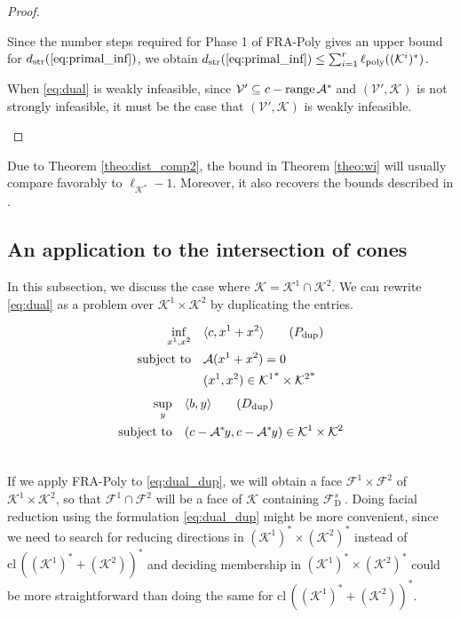 \documentclass{article}
\newcommand{\closure}{\mathrm{cl}\,}
\newcommand{\inProd}[2]{\langle #1 , #2 \rangle }
\newcommand{\feasS}{\mathcal{F}_{\text{D }}^s}
\newcommand{\stdMap}{ {\mathcal{A}}}
\newcommand{\stdCone}{ {\mathcal{K}}}
\newcommand{\stdAffine}{ \mathcal{V}}
\newcommand{\stdFace}{ \mathcal{F}}
\newcommand{\matRange}{{\mathrm{ range } \,}}
\newcommand{\distP}{\ell _{\text{poly}}}
\newcommand{\distS}{d _{\text{str}}}
\newcommand{\T}{\ast\hspace{-1pt}}
\begin{document}
\begin{proof}
\begin{enumerate}[label=({\it\roman*}),wide, labelwidth=!]
Since the number steps required for Phase 1 of FRA-Poly gives an upper bound for 
$\distS(\text{\ref{eq:primal_inf}})$, we obtain $\distS(\text{\ref{eq:primal_inf}}) \leq \sum _{i=1}^{r} \distP((\stdCone ^i)^*)$.

When \eqref{eq:dual} is weakly infeasible, since $\stdAffine ' \subseteq c - \matRange \stdMap^\T$ and 
$(\stdAffine ', \stdCone)$ is  not strongly infeasible,  it must be the case that 
$(\stdAffine ', \stdCone)$ is weakly infeasible.
\end{enumerate}


\end{proof}


Due to Theorem \ref{theo:dist_comp2}, the bound in Theorem \ref{theo:wi} will usually 
compare favorably to $\ell _{\stdCone^*} - 1$. Moreover, it also recovers 
the bounds described in \cite{lourenco_muramatsu_tsuchiya,lourenco_muramatsu_tsuchiya2}.



\subsection{An application to the intersection of cones}\label{sec:intersection}
In this  subsection, we discuss the case where $\stdCone = \stdCone^1 \cap \stdCone^2$.
We can rewrite \eqref{eq:dual} as a problem over 
$\stdCone^1\times \stdCone^2$ by duplicating the entries. 
\vspace{-2\baselineskip}
\begin{multicols}{2}
	\begin{align} 
	\underset{x^1,x^2}{\inf} & \quad \inProd{c}{x^1+x^2} \label{eq:primal_dup}\tag{$P_{\text{dup}}$}\\ 
	\mbox{subject to} & \quad \stdMap (x^1 + x^2) = 0 \nonumber \\ 
	&\quad (x^1, x^2)\in {\stdCone^1}^*\times {\stdCone^2}^* \nonumber 
	\end{align}
	\break
\begin{align}
\underset{y}{\sup} & \quad \inProd{b}{y} \label{eq:dual_dup} \tag{$D_{\text{dup}}$} \\ 
\mbox{subject to} & \quad (c - \stdMap ^\T y,c - \stdMap ^\T y)  \in \stdCone^1\times \stdCone^2 \nonumber \\ \nonumber 
\end{align} 
\end{multicols}
If we apply FRA-Poly to \eqref{eq:dual_dup}, we will obtain a face $\stdFace^1\times \stdFace ^2$ of 
$\stdCone^1\times \stdCone^2$, so that $\stdFace ^1 \cap \stdFace ^2$ will be a face of 
$\stdCone$ containing $\feasS$. Doing facial reduction using the formulation 
\eqref{eq:dual_dup} might be more convenient, since we need to search for reducing 
directions in $(\stdCone^1)^* \times (\stdCone^2)^*$ instead of $\closure((\stdCone^1)^* + (\stdCone^2))^*$  and deciding 
membership in $(\stdCone^1)^* \times (\stdCone^2)^*$ could be more straightforward than doing the same 
for $\closure((\stdCone^1)^* + (\stdCone^2))^*$. 
\end{document}
